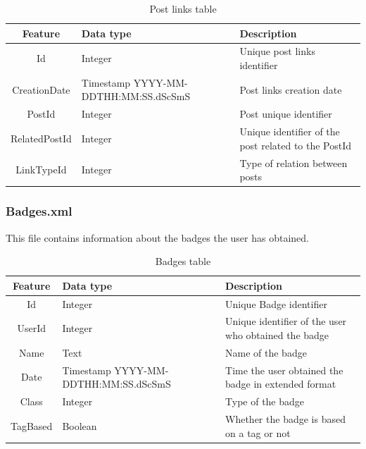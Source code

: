 \documentclass[11pt]{article} %
\begin{document}
      \begin{table}[!ht]
        \begin{tabular}{|c|p{}|p{}|}
          \hline

          Feature & Data type & Description \\ \hline
          Id & Integer & Unique post links identifier \\
          CreationDate & Timestamp YYYY-MM-DDTHH:MM:SS.dScSmS & Post links creation date \\ \hline
          PostId & Integer & Post unique identifier \\ \hline
          RelatedPostId & Integer & Unique identifier of the post related to the PostId \\ \hline
          LinkTypeId & Integer & Type of relation between posts \\

          \hline
        \end{tabular}
        \caption{Post links table}
        \label{tab:postlinks}
      \end{table}

    \subsubsection{Badges.xml}

      This file contains information about the badges the user has obtained.

      \begin{table}[!ht]
        \centering
        \begin{tabular}{|c|p{}|p{}|}
          \hline

          Feature & Data type & Description \\ \hline
          Id & Integer & Unique Badge identifier \\ \hline
          UserId & Integer & Unique identifier of the user who obtained the badge \\ \hline
          Name & Text & Name of the badge \\ \hline
          Date & Timestamp YYYY-MM-DDTHH:MM:SS.dScSmS & Time the user obtained the badge in extended format \\ \hline
          Class & Integer & Type of the badge \\ \hline
          TagBased & Boolean & Whether the badge is based on a tag or not \\

          \hline
        \end{tabular}
        \caption{Badges table}
        \label{tab:badges}
      \end{table}
\end{document}
